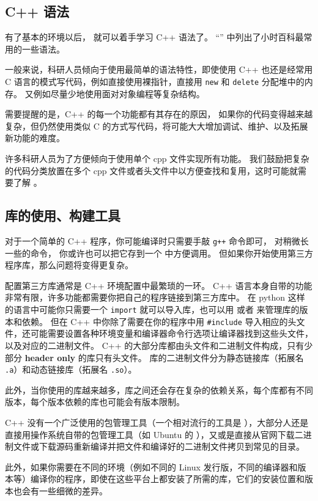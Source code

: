 \subsection{C++ 语法}
有了基本的环境以后， 就可以着手学习 C++ 语法了。 “” 中列出了小时百科最常用的一些语法。

一般来说，科研人员倾向于使用最简单的语法特性，即使使用 C++ 也还是经常用 C 语言的模式写代码，例如直接使用裸指针，直接用 \verb`new` 和 \verb`delete` 分配堆中的内存。 又例如尽量少地使用面对对象编程等复杂结构。

需要提醒的是，C++ 的每一个功能都有其存在的原因， 如果你的代码变得越来越复杂，但仍然使用类似 C 的方式写代码，将可能大大增加调试、维护、以及拓展新功能的难度。

许多科研人员为了方便倾向于使用单个 cpp 文件实现所有功能。 我们鼓励把复杂的代码分类放置在多个 cpp 文件或者头文件中以方便查找和复用，这时可能就需要了解 。

\subsection{库的使用、构建工具}
对于一个简单的 C++ 程序，你可能编译时只需要手敲 \verb`g++` 命令即可， 对稍微长一些的命令， 你或许也可以把它存到一个 中方便调用。 但如果你开始使用第三方程序库，那么问题将变得更复杂。

配置第三方库通常是 C++ 环境配置中最繁琐的一环。 C++ 语言本身自带的功能非常有限，许多功能都需要你把自己的程序链接到第三方库中。 在 python 这样的语言中可能你只需要一个 \verb`import` 就可以导入库，也可以用  或者  来管理库的版本和依赖。 但在 C++ 中你除了需要在你的程序中用 \verb`#include` 导入相应的头文件，还可能需要设置各种环境变量和编译器命令行选项让编译器找到这些头文件，以及对应的二进制文件。 C++ 的大部分库都由头文件和二进制文件构成，只有少部分 \textbf{header only} 的库只有头文件。 库的二进制文件分为静态链接库（拓展名 \verb`.a`）和动态链接库（拓展名 \verb`.so`）。

此外，当你使用的库越来越多，库之间还会存在复杂的依赖关系，每个库都有不同版本，每个版本依赖的库也可能会有版本限制。

C++ 没有一个广泛使用的包管理工具（一个相对流行的工具是 ），大部分人还是直接用操作系统自带的包管理工具（如 Ubuntu 的 ），又或是直接从官网下载二进制文件或下载源码重新编译并把文件和编译好的二进制文件拷贝到常见的目录。

此外，如果你需要在不同的环境（例如不同的 Linux 发行版，不同的编译器和版本等）编译你的程序，即使在这些平台上都安装了所需的库，它们的安装位置和版本也会有一些细微的差异。

